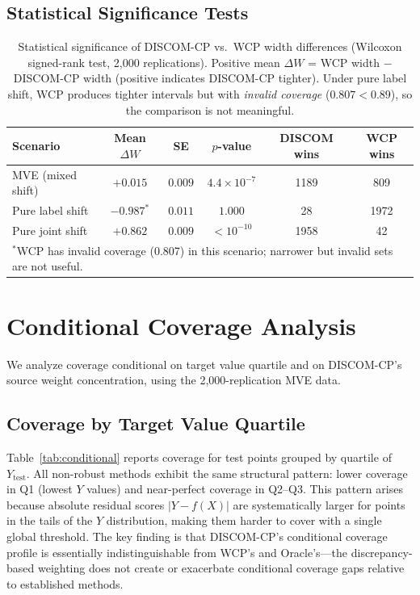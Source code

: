 \documentclass{article}
\newcommand{\DISCOM}{\textsc{DISCOM-CP}}
\begin{document}
\subsection*{Statistical Significance Tests}

\begin{table}[h]
\caption{Statistical significance of \DISCOM{} vs.\ WCP width differences (Wilcoxon signed-rank test, 2,000 replications). Positive mean $\Delta W$ = WCP width $-$ \DISCOM{} width (positive indicates \DISCOM{} tighter). Under pure label shift, WCP produces tighter intervals but with \emph{invalid coverage} ($0.807 < 0.89$), so the comparison is not meaningful.}
\label{tab:significance}
\centering
\small
\begin{tabular}{lccccc}
\toprule
\textbf{Scenario} & \textbf{Mean $\Delta W$} & \textbf{SE} & \textbf{$p$-value} & \textbf{DISCOM wins} & \textbf{WCP wins} \\
\midrule
MVE (mixed shift) & $+0.015$ & $0.009$ & $4.4 \times 10^{-7}$ & 1189 & 809 \\
Pure label shift & $-0.987^*$ & $0.011$ & $1.000$ & 28 & 1972 \\
Pure joint shift & $+0.862$ & $0.009$ & $< 10^{-10}$ & 1958 & 42 \\
\bottomrule
\multicolumn{6}{l}{\scriptsize $^*$WCP has invalid coverage (0.807) in this scenario; narrower but invalid sets are not useful.}
\end{tabular}
\end{table}

\section{Conditional Coverage Analysis}
\label{app:conditional}

We analyze coverage conditional on target value quartile and on \DISCOM{}'s source weight concentration, using the 2{,}000-replication MVE data.

\subsection*{Coverage by Target Value Quartile}

Table~\ref{tab:conditional} reports coverage for test points grouped by quartile of $Y_{\text{test}}$. All non-robust methods exhibit the same structural pattern: lower coverage in Q1 (lowest $Y$ values) and near-perfect coverage in Q2--Q3. This pattern arises because absolute residual scores $|Y - f(X)|$ are systematically larger for points in the tails of the $Y$ distribution, making them harder to cover with a single global threshold. The key finding is that \DISCOM{}'s conditional coverage profile is essentially indistinguishable from WCP's and Oracle's---the discrepancy-based weighting does not create or exacerbate conditional coverage gaps relative to established methods.
\end{document}
